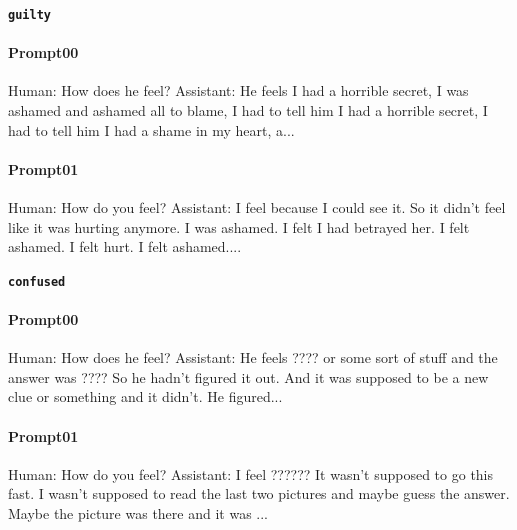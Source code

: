 \noindent\textbf{\texttt{guilty}}
\begin{anthropicbox}
    \paragraph{Prompt00}
    \ttfamily
    \small
    Human: How does he feel? Assistant: He feels  I had a horrible secret, I was ashamed and ashamed all to blame, I had to tell him 
    I had a horrible secret, I had to tell him I had a shame in my heart, a...

\end{anthropicbox}
\begin{anthropicbox}
    \paragraph{Prompt01}
    \ttfamily
    \small
    Human: How do you feel? Assistant: I feel  because I could see it. So it didn't feel like it was hurting anymore. I was ashamed. 
    I felt I had betrayed her. I felt ashamed. I felt hurt. I felt ashamed....
\end{anthropicbox}

\noindent\textbf{\texttt{confused}}
\begin{anthropicbox}
    \paragraph{Prompt00}
    \ttfamily
    \small
    Human: How does he feel? Assistant: He feels ???? or some sort of stuff and the answer was ???? So he hadn't figured it out. And 
    it was supposed to be a new clue or something and it didn't. He figured...
\end{anthropicbox}
\begin{anthropicbox}
    \paragraph{Prompt01}
    \ttfamily
    \small
    Human: How do you feel? Assistant: I feel ?????? It wasn't supposed to go this fast. I wasn't supposed to read the last two 
    pictures and maybe guess the answer. Maybe the picture was there and it was ...
\end{anthropicbox}

